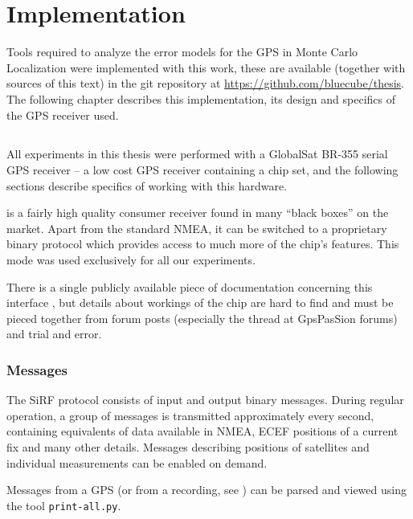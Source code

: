\chapter{Implementation}
\label{chap:implementation}

Tools required to analyze the error models for the GPS in Monte Carlo Localization
were implemented with this work, these are
available (together with sources of this text) in the git repository at
\url{https://github.com/bluecube/thesis}.
The following chapter describes this implementation, its design and
specifics of the GPS receiver used.

\section{\sirf}
\label{sec:impl-sirf}

All experiments in this thesis were performed with a GlobalSat BR-355 serial GPS
receiver -- a low cost GPS receiver containing
a \sirf chip set, and the following sections describe specifics of working with
this hardware.

\sirf is a fairly high quality consumer receiver found in many
\enquote{black boxes} on the market.
Apart from the standard NMEA, it can be switched to a proprietary binary protocol
which provides access to much more of the chip's features.
This mode was used exclusively for all our experiments.

There is a single publicly available piece of documentation concerning this
interface \cite{sirf-protocol}, but details about workings of the chip are hard
to find and must be pieced together from forum posts (especially the thread
\cite{gpspassion-sirf} at GpsPasSion forums) and trial and error.

\subsection{Messages}
The SiRF protocol consists of input and output binary messages.
During regular operation, a group of messages is transmitted approximately every second,
containing equivalents of data available in NMEA, ECEF positions of a current
fix and many other details.
Messages describing positions of satellites and individual measurements can be
enabled on demand.

Messages from a GPS (or from a recording, see ) can be
parsed and viewed using the tool \verb=print-all.py=.

